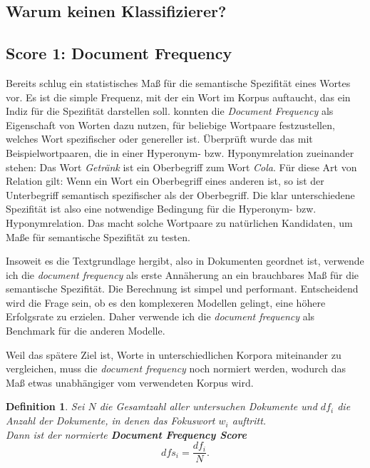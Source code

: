 \documentclass[11pt,numbers=noenddot]{scrartcl}
\newtheorem*{defi}{Definition}
\begin{document}
\subsection{Warum keinen Klassifizierer?}

\subsection{Score 1: Document Frequency} \label{df}
Bereits \citet{sparckjones1972} schlug ein statistisches Maß für die semantische Spezifität eines Wortes vor. Es ist die simple Frequenz, mit der ein Wort im Korpus auftaucht, das ein Indiz für die Spezifität darstellen soll. \citet{Caraballo99determiningthe} konnten die \emph{Document Frequency} als Eigenschaft von Worten dazu nutzen, für beliebige Wortpaare festzustellen, welches Wort  spezifischer oder genereller ist. Überprüft wurde das mit Beispielwortpaaren, die in einer Hyperonym- bzw. Hyponymrelation zueinander stehen: Das Wort \emph{Getränk} ist ein Oberbegriff zum Wort \emph{Cola}. Für diese Art von Relation gilt: Wenn ein Wort ein Oberbegriff eines anderen ist, so ist der Unterbegriff semantisch spezifischer als der Oberbegriff. Die klar unterschiedene Spezifität ist also eine notwendige Bedingung für die Hyperonym- bzw. Hyponymrelation. Das macht solche Wortpaare zu natürlichen Kandidaten, um Maße für semantische Spezifität zu testen.

Insoweit es die Textgrundlage hergibt, also in Dokumenten geordnet ist, verwende ich die \emph{document frequency} als erste Annäherung an ein brauchbares Maß für die semantische Spezifität. Die Berechnung ist simpel und performant. Entscheidend wird die Frage sein, ob es den komplexeren Modellen gelingt, eine höhere Erfolgsrate zu erzielen. Daher verwende ich die \emph{document frequency} als Benchmark für die anderen Modelle.

Weil das spätere Ziel ist, Worte in unterschiedlichen Korpora miteinander zu vergleichen, muss die \emph{document frequency} noch normiert werden, wodurch das Maß etwas unabhängiger vom verwendeten Korpus wird.

\begin{defi}
Sei $N$ die Gesamtzahl aller untersuchen Dokumente und $df_i$ die Anzahl der Dokumente, in denen das Fokuswort $w_i$ auftritt. \\ Dann ist der normierte \textbf{Document Frequency Score}
\begin{equation}
    dfs_i = \frac{df_i}{N}.
\end{equation}
\end{defi}
\end{document}
